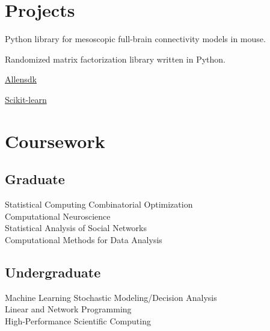 \documentclass[]{deedy-resume-openfont}
\begin{document}
\begin{minipage}[t]{0.35\textwidth}

\section{Projects}
Python library for mesoscopic full-brain connectivity models in mouse.
\sectionsep

Randomized matrix factorization library written in Python.
\sectionsep

\vspace{\topsep}
\begin{tightemize}
\item \href{https://github.com/alleninstitute/allensdk}{Allensdk}
\item \href{https://github.com/scikit-learn/scikit-learn}{Scikit-learn}
\end{tightemize}
\sectionsep



\section{Coursework}
\subsection{Graduate}
Statistical Computing
Combinatorial Optimization \\
Computational Neuroscience \\
Statistical Analysis of Social Networks \\
Computational Methods for Data Analysis \\
\sectionsep

\subsection{Undergraduate}
Machine Learning
Stochastic Modeling/Decision Analysis \\
Linear and Network Programming \\
High-Performance Scientific Computing \\



\end{minipage}
\end{document}
